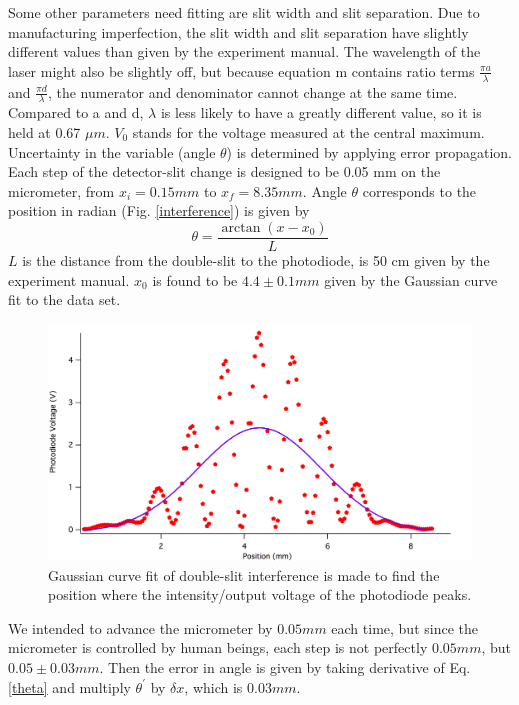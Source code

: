 \documentclass[prb,preprint]{revtex4-1}
\begin{document}
Some other parameters need fitting are slit width and slit separation. Due to manufacturing imperfection, the slit width and slit separation have slightly different values than given by the experiment manual. The wavelength of the laser might also be slightly off, but because equation m contains ratio terms $\frac{\pi a}{\lambda}$ and $\frac{\pi d}{\lambda}$, the numerator and denominator cannot change at the same time. Compared to a and d, $\lambda$ is less likely to have a greatly different value, so it is held at 0.67 $\mu m$. $V_{0}$ stands for the voltage measured at the central maximum.\\

Uncertainty in the variable (angle $\theta$) is determined by applying error propagation. Each step of the detector-slit change is designed to be 0.05 mm on the micrometer, from $x_i = 0.15 mm$ to $x_f = 8.35 mm$. Angle $\theta$ corresponds to the position in radian (Fig. \ref{interference}) is given by
\begin{equation}
\theta = \frac{\arctan(x-x_0)}{L}
\label{theta}
\end{equation}
$L$ is the distance from the double-slit to the photodiode, is 50 cm given by the experiment manual.
$x_0$ is found to be $4.4 \pm 0.1mm$ given by the Gaussian curve fit to the data set.

\begin{figure}[h]
\centering
\includegraphics[width=7in]{doublegaus.pdf}
\caption{Gaussian curve fit of double-slit interference is made to find the position where the intensity/output voltage of the photodiode peaks.}
\label{gasfit}
\end{figure}

We intended to advance the micrometer by $0.05 mm$ each time, but since the micrometer is controlled by human beings, each step is not perfectly $0.05 mm$, but $0.05\pm0.03 mm$.
Then the error in angle is given by taking derivative of Eq. \ref{theta} and multiply $\theta^\prime$ by $\delta x$, which is $0.03 mm$. 
\end{document}
